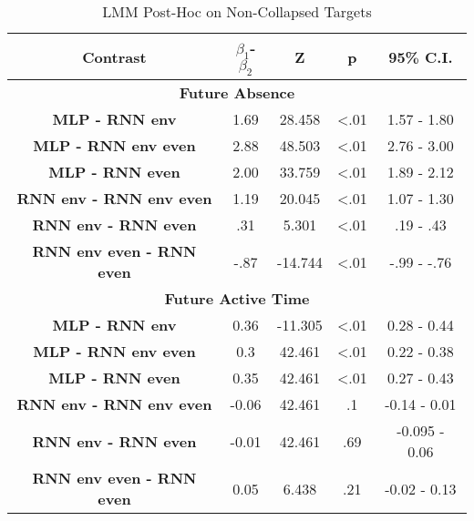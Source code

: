 \begin{table}[h]
\centering
\caption{LMM Post-Hoc on Non-Collapsed Targets}
\label{exploded_post_hoc_33}
\begin{tabular}{ccccc}
\hline
\textbf{Contrast}  & \textbf{$\beta_1$-$\beta_2$} & \textbf{Z} & \textbf{p} & \textbf{95\% C.I.}                  \\ \hline
\multicolumn{5}{c}{\textbf{Future Absence}}                                                                         \\ \hline
\textbf{MLP - RNN env} & 1.69                & 28.458     & \textless .01   & 1.57 - 1.80                    \\
\textbf{MLP - RNN env even}           & 2.88                & 48.503     & \textless .01   & 2.76 - 3.00                     \\
\textbf{MLP - RNN even}           & 2.00                & 33.759     & \textless .01   &  1.89 - 2.12                     \\
\textbf{RNN env - RNN env even}           & 1.19                & 20.045     & \textless .01   & 1.07 - 1.30                     \\
\textbf{RNN env - RNN even}           & .31                & 5.301     & \textless .01   & .19 - .43                     \\
\textbf{RNN env even - RNN even}          & -.87                & -14.744     & \textless .01   & -.99 - -.76                    \\ \hline

\multicolumn{5}{c}{\textbf{Future Active Time}}                                                                     \\ \hline
\textbf{MLP - RNN env} & 0.36                & -11.305     & \textless .01   & 0.28 - 0.44                     \\
\textbf{MLP - RNN env even}           & 0.3                 & 42.461     & \textless .01   & 0.22 - 0.38                     \\
\textbf{MLP - RNN even}           & 0.35                & 42.461     & \textless .01   & 0.27 - 0.43                     \\
\textbf{RNN env - RNN env even}           & -0.06                & 42.461     & .1   & -0.14 - 0.01                     \\
\textbf{RNN env - RNN even}           & -0.01                & 42.461     &  .69   & -0.095 - 0.06                     \\
\textbf{RNN env even - RNN even}          & 0.05                & 6.438     &  .21   & -0.02 - 0.13                    \\ \hline


\end{tabular}
\end{table}
